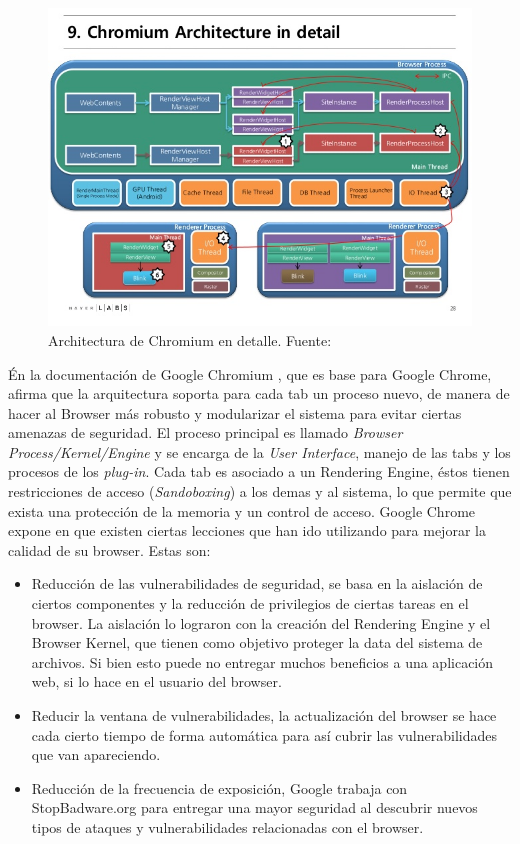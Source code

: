     \begin{figure}[h!t]
	    \centering
	    \includegraphics[scale=0.5]{figures/chromium-rendering-pipeline-28-638.jpg}
        \caption{Architectura de Chromium en detalle. Fuente: \cite{ChrRenderPipe}}
        \label{fig:archGC2}
    \end{figure}

    Én la documentación de Google Chromium \cite{multiProcGC}, que es base para Google Chrome, afirma que la arquitectura soporta para cada tab un proceso nuevo, de manera de hacer al Browser más robusto y modularizar el sistema para evitar ciertas amenazas de seguridad. El proceso principal es llamado \textit{Browser Process/Kernel/Engine} y se encarga de la \textit{User Interface}, manejo de las tabs y los procesos de los \textit{plug-in}. Cada tab es asociado a un Rendering Engine, éstos tienen restricciones de acceso (\textit{Sandoboxing}) a los demas y al sistema, lo que permite que exista una protección de la memoria y un control de acceso. Google Chrome expone en \cite{reis2009browser} que existen ciertas lecciones que han ido utilizando para mejorar la calidad de su browser. Estas son:

    \begin{itemize}
    	\item Reducción de las vulnerabilidades de seguridad, se basa en la aislación de ciertos componentes y la reducción de privilegios de ciertas tareas en el browser. La aislación lo lograron con la creación del Rendering Engine y el Browser Kernel, que tienen como objetivo proteger la data del sistema de archivos. Si bien esto puede no entregar muchos beneficios a una aplicación web, si lo hace en el usuario del browser.
    	\item Reducir la ventana de vulnerabilidades, la actualización del browser se hace cada cierto tiempo de forma automática para así cubrir las vulnerabilidades que van apareciendo.
    	\item Reducción de la frecuencia de exposición, Google trabaja con StopBadware.org para entregar una mayor seguridad al descubrir nuevos tipos de ataques y vulnerabilidades relacionadas con el browser.
    \end{itemize}

